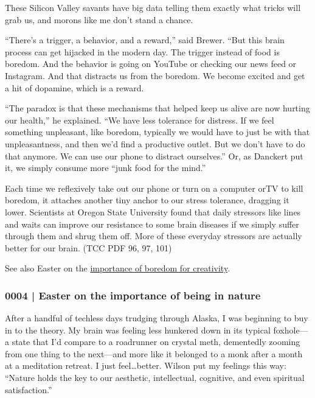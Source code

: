 			These Silicon Valley savants have big data telling them exactly what tricks will grab us, and morons like me don't stand a chance. 
			
			``There's a trigger, a behavior, and a reward,'' said Brewer. ``But this brain process can get hijacked in the modern day. The trigger instead of food is boredom. And the behavior is going on YouTube or checking our news feed or Instagram. And that distracts us from the boredom. We become excited and get a hit of dopamine, which is a reward.
			
			``The paradox is that these mechanisms that helped keep us alive are now hurting our health,'' he explained. ``We have less tolerance for distress. If we feel something unpleasant, like boredom, typically we would have to just be with that unpleasantness, and then we'd find a productive outlet. But we don't have to do that anymore. We can use our phone to distract ourselves.'' Or, as Danckert put it, we simply consume more ``junk food for the mind.'' 

			Each time we reflexively take out our phone or turn on a computer orTV to kill boredom, it attaches another tiny anchor to our stress tolerance, dragging it lower. Scientists at Oregon State University found that daily stressors like lines and waits can improve our resistance to some brain diseases if we simply suffer through them and shrug them off. More of these everyday stressors are actually better for our brain. (TCC PDF 96, 97, 101)
				\begin{compactitem}
					\item See also Easter on the \hyperref[GM-LIFE-CREATIVITY-0001]{importance of boredom for creativity}.
				\end{compactitem}
				
		\subsubsection{0004 | Easter on the importance of being in nature}
			\label{GM-LIFE-WORLD-0004}
				
			After a handful of techless days trudging through Alaska, I was beginning to buy in to the theory. My brain was feeling less hunkered down in its typical foxhole---a state that I'd compare to a roadrunner on crystal meth, dementedly zooming from one thing to the next---and more like it belonged to a monk after a month at a meditation retreat. I just feel…better. Wilson put my feelings this way: ``Nature holds the key to our aesthetic, intellectual, cognitive, and even spiritual satisfaction.''
			
